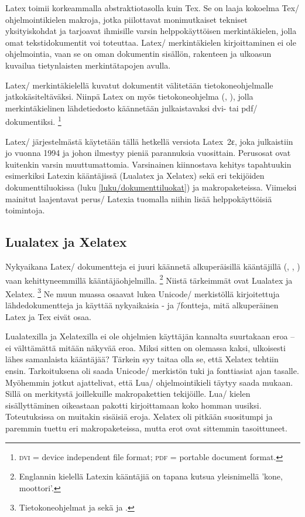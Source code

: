 Latex toimii korkeammalla abstraktiotasolla kuin Tex. Se on laaja
kokoelma Tex\-/ ohjelmointikielen makroja, jotka piilottavat
monimutkaiset tekniset yksityiskohdat ja tarjoavat ihmisille varsin
helppokäyttöisen merkintäkielen, jolla omat tekstidokumentit voi
toteuttaa. Latex\-/ merkintäkielen kirjoittaminen ei ole ohjelmointia,
vaan se on oman dokumentin sisällön, rakenteen ja ulkoasun kuvailua
tietynlaisten merkintätapojen avulla.

Latex\-/ merkintäkielellä kuvatut dokumentit välitetään
tietokoneohjelmalle jatkokäsiteltäväksi. Niinpä Latex on myös
tietokoneohjelma (, ), jolla
merkintäkielinen lähdetiedosto käännetään julkaistavaksi dvi- tai pdf\-/
dokumentiksi.%
\footnote{\textsc{dvi} = device independent file format; \textsc{pdf} =
  portable document format.}

Latex\-/ järjestelmästä käytetään tällä hetkellä versiota Latex~2ε, joka
julkaistiin jo vuonna 1994 ja johon ilmestyy pieniä parannuksia
vuosittain. Perusosat ovat kuitenkin varsin muuttumattomia. Varsinainen
kiinnostava kehitys tapahtuukin esimerkiksi Latexin kääntäjissä
(Lualatex ja Xelatex) sekä eri tekijöiden dokumenttiluokissa (luku
\ref{luku/dokumenttiluokat}) ja makropaketeissa. Viimeksi mainitut
laajentavat perus\-/ Latexia tuomalla niihin lisää helppokäyttöisiä
toimintoja.

\subsection{Lualatex ja Xelatex}

Nykyaikana Latex\-/ dokumentteja ei juuri käännetä alkuperäisillä
kääntäjillä (, , ) vaan
kehittyneemmillä kääntäjäohjelmilla.%
\footnote{Englannin kielellä Latexin kääntäjiä on tapana kutsua
  yleisnimellä  'kone, moottori'.} Niistä tärkeimmät
ovat Lualatex ja Xelatex.%
\footnote{Tietokoneohjelmat  ja  sekä
   ja .} Ne muun muassa osaavat lukea
Unicode\-/ merkistöllä kirjoitettuja lähdedokumentteja ja käyttää
nykyaikaisia - ja  \=/fontteja,
mitä alkuperäinen Latex ja Tex eivät osaa.

Lualatexilla ja Xelatexilla ei ole ohjelmien käyttäjän kannalta
suurtakaan eroa -- ei välttämättä mitään näkyvää eroa. Miksi sitten on
olemassa kaksi, ulkoisesti lähes samanlaista kääntäjää? Tärkein syy
taitaa olla se, että Xelatex tehtiin ensin. Tarkoituksena oli saada
Unicode\-/ merkistön tuki ja fonttiasiat ajan tasalle. Myöhemmin jotkut
ajattelivat, että Lua\-/ ohjelmointikieli täytyy saada mukaan. Sillä on
merkitystä joillekuille makropakettien tekijöille. Lua\-/ kielen
sisällyttäminen oikeastaan pakotti kirjoittamaan koko homman uusiksi.
Toteutuksissa on muitakin sisäisiä eroja. Xelatex oli pitkään suositumpi
ja paremmin tuettu eri makropaketeissa, mutta erot ovat sittemmin
tasoittuneet.


